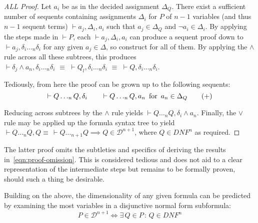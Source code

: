 \begin{proof}[ALL Proof]
        Let $a_i$ be as in the decided assignment $\Delta_Q$.
        There exist a sufficient number of sequents containing assignments $\Delta_i$ for $P$ of $n-1$ variables (and thus $n-1$ sequent terms) $\vdash a_j, \Delta_i, a_i$ such that $a_j \in \Delta_Q$ and $\neg a_i \in \Delta_i$.
        By applying the steps made in $\vdash P$, each $\vdash a_j, \Delta_i, a_i$ can produce a sequent proof down to $\vdash a_j, \delta_i \ldots_n \delta_i$ for any given $a_j \in \Delta$, so construct for all of them.
        By applying the $\wedge$ rule across all these subtrees, this produces $\vdash \delta_j \wedge a_n, \delta_i \ldots_n \delta_i \,\, \equiv \,\, \vdash Q_l, \delta_i \ldots_n \delta_i \,\, \equiv \,\, \vdash Q, \delta_i \ldots_n \delta_i$.

        Tediously, from here the proof can be grown up to the following sequents:
        \begin{equation*}\label{eqn:proof-omission}
            \vdash Q \ldots_n Q, \delta_i \qquad \vdash Q \ldots_n Q, a_n \text{\, for \,} a_n \in \Delta_Q \tag{+}
        \end{equation*}
        
        Reducing across subtrees by the $\wedge$ rule yields $\vdash Q \ldots_n Q, \delta_i \wedge a_n$.
        Finally, the $\vee$ rule may be applied up the formula syntax tree to yield $\vdash Q \ldots_{n} Q, Q \equiv \, \vdash Q \ldots_{n+1} Q \implies Q \in \mathcal{D}^{n+1}$, where $Q \in \textit{DNF}^n$ as required.
    \end{proof}

    \begin{remark}\label{remark:proof-subtleties}
        The latter proof omits the subtleties and specifics of deriving the results in~\eqref{eqn:proof-omission}.
        This is considered tedious and does not aid to a clear representation of the intermediate steps but remains to be formally proven, should such a thing be desirable.
    \end{remark}


    \begin{proposition*}
        Building on the above, the dimensionality of any given formula can be predicted by examining the most variables in a disjunctive normal form subformula:
        \begin{equation*}
            P \in \mathcal{D}^{n+1} \iff \exists \, Q \in P \,:\, Q \in DNF^{n}
        \end{equation*}
    \end{proposition*}

